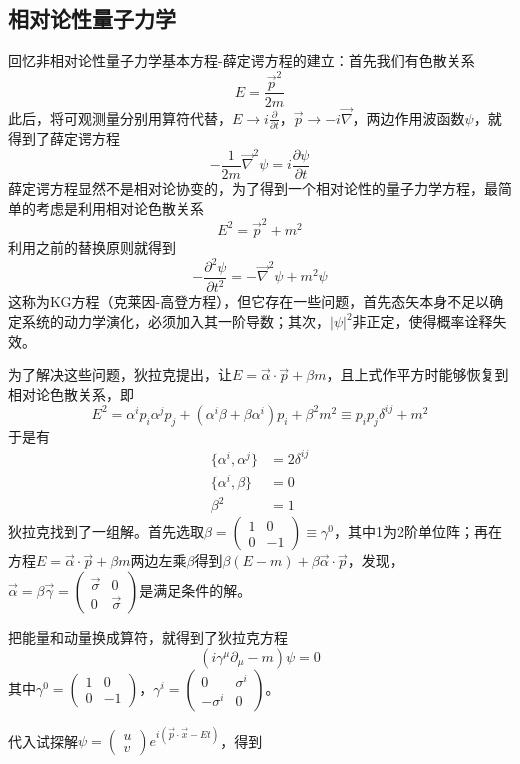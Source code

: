 \documentclass[a4paper,11pt]{ctexart}
\newcommand{\beq}{\begin{equation}}
\newcommand{\eeq}{\end{equation}}
\newcommand{\bea}{\begin{equation}\begin{aligned}}
\newcommand{\eea}{\end{aligned}\end{equation}}
\begin{document}
\subsection{相对论性量子力学}
回忆非相对论性量子力学基本方程-薛定谔方程的建立：首先我们有色散关系
\beq
E = \frac{\vec{p}^2}{2m}
\eeq
此后，将可观测量分别用算符代替，$E \to i \frac{\partial}{\partial t}$，$\vec{p} \to -i \vec{\nabla}$，两边作用波函数$\psi$，就得到了薛定谔方程
\beq
-\frac{1}{2m} \vec{\nabla}^2 \psi = i \frac{\partial \psi}{\partial t}
\eeq
薛定谔方程显然不是相对论协变的，为了得到一个相对论性的量子力学方程，最简单的考虑是利用相对论色散关系
\beq
E^2 = \vec{p}^2 + m^2
\eeq
利用之前的替换原则就得到
\beq
-\frac{\partial^2 \psi}{\partial t^2} = - \vec{\nabla}^2 \psi + m^2 \psi
\eeq
这称为KG方程（克莱因-高登方程），但它存在一些问题，首先态矢本身不足以确定系统的动力学演化，必须加入其一阶导数；其次，$|\psi|^2$非正定，使得概率诠释失效。
\par
为了解决这些问题，狄拉克提出，让$E = \vec{\alpha} \cdot \vec{p} + \beta m$，且上式作平方时能够恢复到相对论色散关系，即
\beq
E^2 = \alpha^i p_i \alpha^j p_j + (\alpha^i \beta + \beta \alpha^i)p_i + \beta^2 m^2 \equiv p_i p_j \delta^{ij} + m^2
\eeq
于是有
\bea
\{ \alpha^i,\alpha^j \} &= 2\delta^{ij} \\
\{\alpha^i,\beta\} &= 0 \\
\beta^2 &= 1
\eea
狄拉克找到了一组解。首先选取$\beta = \begin{pmatrix} 1 & 0 \\ 0 &-1 \end{pmatrix}\equiv \gamma^0$，其中1为2阶单位阵；再在方程$E = \vec{\alpha} \cdot \vec{p} + \beta m$两边左乘$\beta$得到$\beta (E-m) + \beta \vec{\alpha} \cdot \vec{p}$，发现，$\vec{\alpha} = \beta \vec{\gamma} = \begin{pmatrix} \vec{\sigma} & 0 \\ 0 & \vec{\sigma} \end{pmatrix}$是满足条件的解。
\par
把能量和动量换成算符，就得到了狄拉克方程
\beq
(i\gamma^\mu \partial_\mu - m) \psi = 0
\eeq
其中$\gamma^0 = \begin{pmatrix} 1 & 0 \\ 0 & -1 \end{pmatrix}$，$\gamma^i = \begin{pmatrix} 0 & \sigma^i \\ - \sigma^i & 0 \end{pmatrix}$。
\par
代入试探解$\psi = \begin{pmatrix} u \\ v \end{pmatrix} e^{i(\vec{p} \cdot \vec{x} - Et)}$，得到
\end{document}

